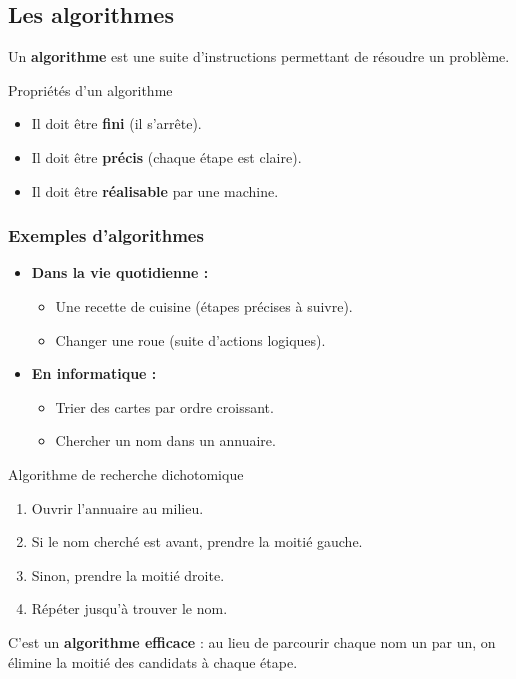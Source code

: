 \subsection{Les algorithmes}

Un \textbf{algorithme} est une suite d’instructions permettant de résoudre un problème.

\begin{UPSTIinfor}{Propriétés d’un algorithme}
	\begin{itemize}
		\item Il doit être \textbf{fini} (il s’arrête).
		\item Il doit être \textbf{précis} (chaque étape est claire).
		\item Il doit être \textbf{réalisable} par une machine.
	\end{itemize}
\end{UPSTIinfor}

\subsubsection{Exemples d’algorithmes}

\begin{itemize}
	\item \textbf{Dans la vie quotidienne :}
	      \begin{itemize}
		      \item Une recette de cuisine (étapes précises à suivre).
		      \item Changer une roue (suite d’actions logiques).
	      \end{itemize}
\end{itemize}

\begin{itemize}
	\item \textbf{En informatique :}
	      \begin{itemize}
		      \item Trier des cartes par ordre croissant.
		      \item Chercher un nom dans un annuaire.
	      \end{itemize}
\end{itemize}

\begin{UPSTIinfor}{Algorithme de recherche dichotomique}
	\begin{enumerate}
		\item Ouvrir l’annuaire au milieu.
		\item Si le nom cherché est avant, prendre la moitié gauche.
		\item Sinon, prendre la moitié droite.
		\item Répéter jusqu’à trouver le nom.
	\end{enumerate}
\end{UPSTIinfor}

C’est un \textbf{algorithme efficace} : au lieu de parcourir chaque nom un par un, on élimine la moitié des candidats à chaque étape.